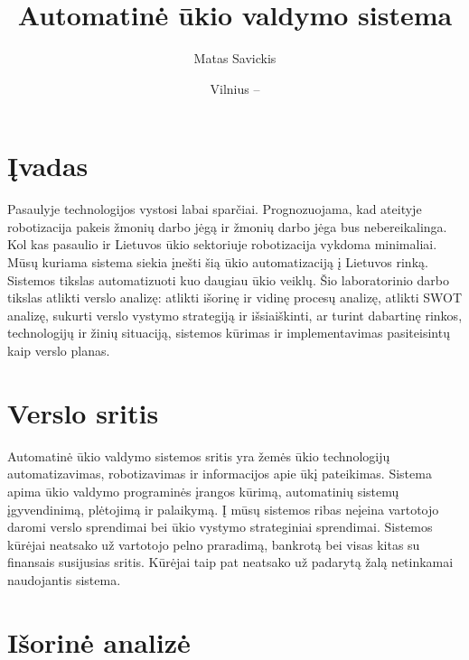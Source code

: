 \documentclass[oneside]{VUMIFPSkursinis}
\title{Automatinė ūkio valdymo sistema}
\author{Matas Savickis}
\date{Vilnius – \the\year}
\begin{document}
\maketitle
\tableofcontents


\section{Įvadas}
Pasaulyje technologijos vystosi labai sparčiai. Prognozuojama, kad ateityje robotizacija pakeis žmonių darbo jėgą ir žmonių darbo jėga bus nebereikalinga. Kol kas pasaulio ir Lietuvos ūkio sektoriuje robotizacija vykdoma minimaliai. Mūsų kuriama sistema siekia įnešti šią ūkio automatizaciją į Lietuvos rinką. Sistemos tikslas automatizuoti kuo daugiau ūkio veiklų. Šio laboratorinio darbo tikslas atlikti verslo analizę: atlikti išorinę ir vidinę procesų analizę, atlikti SWOT analizę, sukurti verslo vystymo strategiją ir išsiaiškinti, ar turint dabartinę rinkos, technologijų ir žinių situaciją, sistemos kūrimas ir implementavimas pasiteisintų kaip verslo planas.
\section{Verslo sritis}
	Automatinė ūkio valdymo sistemos sritis yra žemės ūkio technologijų automatizavimas, robotizavimas ir informacijos apie ūkį pateikimas. Sistema apima ūkio valdymo programinės įrangos kūrimą, automatinių sistemų įgyvendinimą, plėtojimą ir palaikymą. Į mūsų sistemos ribas neįeina vartotojo daromi verslo sprendimai bei ūkio vystymo strateginiai sprendimai. Sistemos kūrėjai neatsako už vartotojo pelno praradimą, bankrotą bei visas kitas su finansais susijusias sritis. Kūrėjai taip pat neatsako už padarytą žalą netinkamai naudojantis sistema.   

\section{Išorinė analizė}
\end{document}
